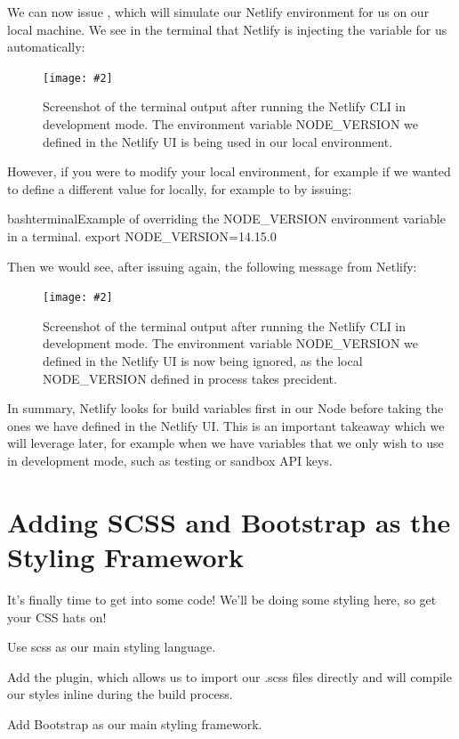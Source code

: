 \documentclass[paper=6in:9in,pagesize=pdftex,headinclude=on,footinclude=on,12pt]{scrbook}
\newcommand{\standardfigure}[3]{\begin{figure}[H]\begin{center}\texttt{[image: \#2]}\caption{#3}\label{fig:#2}\end{center}\end{figure}}
\begin{document}

We can now issue , which will simulate our Netlify environment for us on our local machine. We see in the terminal that Netlify is injecting the  variable for us automatically:

\standardfigure{\textwidth}{frontend/netlify/netlify-injected-build-var}{Screenshot of the terminal output after running the Netlify CLI in development mode. The environment variable NODE\_VERSION we defined in the Netlify UI is being used in our local environment.}

However, if you were to modify your local environment, for example if we wanted to define a different value for  locally, for example to  by issuing:

\begin{codeInput}{bash}{terminal}{Example of overriding the NODE\_VERSION environment variable in a terminal.}
export NODE_VERSION=14.15.0
\end{codeInput}

Then we would see, after issuing  again, the following message from Netlify:

\standardfigure{\textwidth}{frontend/netlify/netlify-ignored-build-var}{Screenshot of the terminal output after running the Netlify CLI in development mode. The environment variable NODE\_VERSION we defined in the Netlify UI is now being ignored, as the local NODE\_VERSION defined in process takes precident.}

In summary, Netlify looks for build variables first in our Node  before taking the ones we have defined in the Netlify UI. This is an important takeaway which we will leverage later, for example when we have variables that we only wish to use in development mode, such as testing or sandbox API keys.

\section{Adding SCSS and Bootstrap as the Styling Framework}

It's finally time to get into some code! \partypopper We'll be doing some styling here, so get your CSS hats on!

\begin{arrows}
\item Use scss as our main styling language.
\item Add the  plugin, which allows us to import our .scss files directly and will compile our styles inline during the build process.
\item Add Bootstrap as our main styling framework.
\end{arrows}
\end{document}
